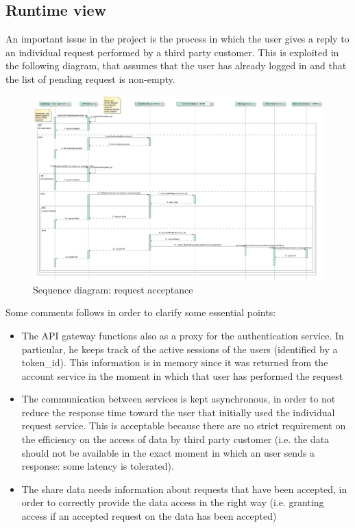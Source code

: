 \subsection{Runtime view}
An important issue in the project is the process in which the user gives a reply to an individual request
performed by a third party customer. This is exploited in the following diagram, that assumes that the user
has already logged in and that the list of pending request is non-empty.

\begin{figure}[H]
\includegraphics[width=\linewidth]{Images/requestacceptance.pdf}
\caption{ Sequence diagram: request acceptance }
\label{fig:world2}
\end{figure}

Some comments follows in order to clarify some essential points:
\begin{itemize}
\item The API gateway functions also as a proxy for the authentication service. In particular, he keeps track of the active sessions of the
users (identified by a token\_id). This information is in memory since
it was returned from the account service in the moment in which that user has performed the request
\item The communication between services is kept asynchronous, in order to not reduce the response time 
toward the user that initially used the individual request service. This is acceptable because there are
no strict requirement on the efficiency on the access of data by third party customer (i.e. the data should
not be available in the exact moment in which an user sends a response: some latency is tolerated). 
\item The share data needs information about requests that have been accepted, in order to correctly
provide the data access in the right way (i.e. granting access if an accepted request on the data has been 
accepted) 
\end{itemize}

